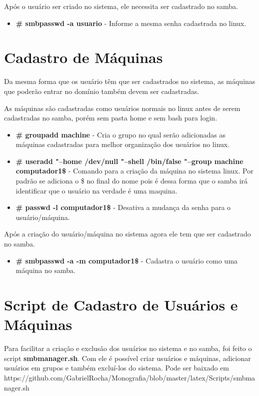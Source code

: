Após o usuário ser criado no sistema, ele necessita ser cadastrado no samba.

\begin{itemize}
	\item \textbf{\# smbpasswd -a usuario} - Informe a mesma senha cadastrada no linux.
\end{itemize}

\section{Cadastro de Máquinas}

Da mesma forma que os usuário têm que ser cadastrados no sistema, as máquinas que poderão entrar no domínio também devem ser cadastradas.

As máquinas são cadastradas como usuários normais no linux antes de serem cadastradas no samba, porém sem pasta home e sem bash para login.

\begin{itemize}
	\item \textbf{\# groupadd machine} - Cria o grupo no qual serão adicionadas as máquinas cadastradas para melhor organização dos usuários no linux.
	\item \textbf{\# useradd "--home /dev/null "--shell /bin/false "--group machine computador1\$} - 	Comando para a criação da máquina no sistema linux. Por padrão se adiciona o \$ no final do nome pois é dessa forma que o samba irá identificar que o usuário na verdade é uma maquina. 
	\item \textbf{\# passwd -l computador1\$} - Desativa a mudança da senha para o usuário/máquina.
\end{itemize}

Após a criação do usuário/máquina no sistema agora ele tem que ser cadastrado no samba.

\begin{itemize}	
	\item \textbf{\# smbpasswd -a -m computador1\$} - Cadastra o usuário como uma máquina no samba.
\end{itemize}


\section{Script de Cadastro de Usuários e Máquinas}

Para facilitar a criação e exclusão dos usuários no sistema e no samba, foi feito o script \textbf{smbmanager.sh}. Com ele é possível criar usuários e máquinas, adicionar usuários em grupos e também excluí-los do sistema. Pode ser baixado em https://github.com/GabrielRocha/Monografia/blob/master/latex/Scripts/smbmanager.sh

